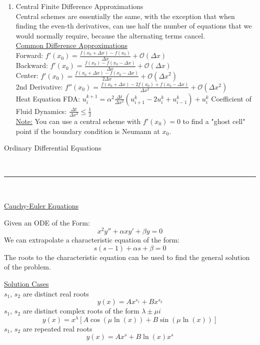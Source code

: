 \documentclass{article}
\begin{document}
\begin{enumerate}
    \item Central Finite Difference Approximations
    \medskip\\
    Central schemes are essentially the same, with the exception that when finding the even-th derivatives, can use half the number of equations that we would normally require, because the alternating terms cancel.
    \bigskip\\
    \underline{Common Difference Approximations}
    \medskip\\
    Forward: $f'(x_0)=\frac{f(x_0+\Delta x)-f(x_0)}{\Delta x}+\mathcal{O}(\Delta x)$
    \medskip\\
    Backward: $f'(x_0)=\frac{f(x_0)-f(x_0-\Delta x)}{\Delta x}+\mathcal{O}(\Delta x)$
    \medskip\\
    Center: $f'(x_0)=\frac{f(x_0+\Delta x)-f(x_0-\Delta x)}{2\Delta x}+\mathcal{O}(\Delta x^2)$
    \medskip\\
    2nd Derivative: $f''(x_0)=\frac{f(x_0+\Delta x)-2f(x_0)+f(x_0-\Delta x)}{\Delta x^2}+\mathcal{O}(\Delta x^2)$
    \medskip\\
    Heat Equation FDA: $u_i^{k+1}=\alpha^2\frac{\Delta t}{\Delta x^2}\left({u_{i+1}^k-2u_i^k+u_{i-1}^k}\right)+u_i^k$
    Coefficient of Fluid Dynamics: $\frac{\Delta t}{\Delta x^2} \leq \frac{1}{2} $
    \medskip\\
    \underline{Note:} You can use a central scheme with $f'(x_0) = 0$ to find a "ghost cell" point if the boundary condition is Neumann at $x_0$.
    
    
    

\end{enumerate}

\pagebreak
\begin{large}
    \noindent Ordinary Differential Equations
\end{large}\\
\rule{\textwidth}{0.5pt}\smallskip\\
\begin{center}
\underline{Cauchy-Euler Equations}
\end{center}
\begin{multicols}{2}
    \begin{center}
        Given an ODE of the Form:
        \[
            x^2y'' + \alpha x y' + \beta y = 0
        \]
        We can extrapolate a characteristic equation of the form:
        \[
            s(s-1) + \alpha s + \beta = 0
        \]
        The roots to the characteristic equation can be used to find the general solution of the problem.
        
    
    \vfill\null\columnbreak
    \underline{Solution Cases}
    \medskip\\
    $s_1$, $s_2$ are distinct real roots
    \[
        y(x)=Ax^{s_1} + Bx^{s_2}
    \]
    $s_1$, $s_2$ are distinct complex roots of the form $\lambda \pm \mu i$
    \[
        y(x)=x^\lambda\left[A\cos\left(\mu\ln(x)\right) + B\sin\left(\mu\ln(x)\right)\right]
    \]
    $s_1$, $s_2$ are repeated real roots
    \[
        y(x) = Ax^s + B\ln(x) x^s
    \]
    \end{center}
\end{multicols}
\end{document}
